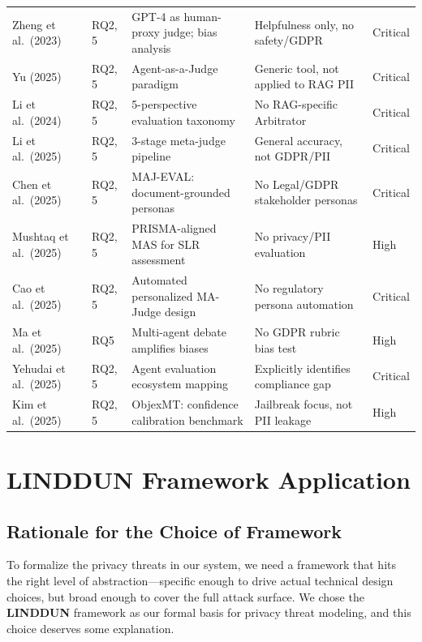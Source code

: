\documentclass[12pt, a4paper]{report}
\begin{document}
\begin{small}
\begin{longtable}{L{3cm} C{1.2cm} L{3.5cm} L{3.5cm} C{1.5cm}}
Zheng et al.\ (2023) & RQ2, 5 & GPT-4 as human-proxy judge; bias analysis & Helpfulness only, no safety/GDPR & Critical \\
Yu (2025) & RQ2, 5 & Agent-as-a-Judge paradigm & Generic tool, not applied to RAG PII & Critical \\
Li et al.\ (2024) & RQ2, 5 & 5-perspective evaluation taxonomy & No RAG-specific Arbitrator & Critical \\
Li et al.\ (2025) & RQ2, 5 & 3-stage meta-judge pipeline & General accuracy, not GDPR/PII & Critical \\
Chen et al.\ (2025) & RQ2, 5 & MAJ-EVAL: document-grounded personas & No Legal/GDPR stakeholder personas & Critical \\
Mushtaq et al.\ (2025) & RQ2, 5 & PRISMA-aligned MAS for SLR assessment & No privacy/PII evaluation & High \\
Cao et al.\ (2025) & RQ2, 5 & Automated personalized MA-Judge design & No regulatory persona automation & Critical \\
Ma et al.\ (2025) & RQ5 & Multi-agent debate amplifies biases & No GDPR rubric bias test & High \\
Yehudai et al.\ (2025) & RQ2, 5 & Agent evaluation ecosystem mapping & Explicitly identifies compliance gap & Critical \\
Kim et al.\ (2025) & RQ2, 5 & ObjexMT: confidence calibration benchmark & Jailbreak focus, not PII leakage & High \\

\end{longtable}
\end{small}

\clearpage
\setlength{\parskip}{5pt}

\chapter{LINDDUN Framework Application}

\section{Rationale for the Choice of Framework}

To formalize the privacy threats in our system, we need a framework that
hits the right level of abstraction---specific enough to drive actual
technical design choices, but broad enough to cover the full attack surface.
We chose the \textbf{LINDDUN} framework as our formal basis for privacy
threat modeling, and this choice deserves some explanation.
\end{document}
